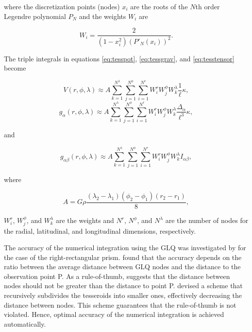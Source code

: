 \documentclass[paper,twocolumn,twoside]{geophysics}
\begin{document}
\noindent
where the discretization points (nodes) $x_i$
are the roots of the $N$th order Legendre polynomial $P_N$
and the weights $W_i$ are \citep{Hildebrand1987}

\begin{equation}
    W_i = \frac{2}{(1 - x_i^2)(P'_N(x_i))^2}.
\end{equation}

The triple integrals in equations
\ref{eq:tesspot},
\ref{eq:tessgrav},
and
\ref{eq:tesstensor}
become

\begin{equation}
    V(r,\phi,\lambda) \approx
        A
        \sum\limits_{k=1}^{N^{\lambda}}
        \sum\limits_{j=1}^{N^{\phi}}
        \sum\limits_{i=1}^{N^r}
        W^r_i W^{\phi}_j W^{\lambda}_k
        \frac{1}{\ell} \kappa,
\end{equation}
\begin{equation}
    g_{\alpha}(r,\phi,\lambda) \approx
        A
        \sum\limits_{k=1}^{N^{\lambda}}
        \sum\limits_{j=1}^{N^{\phi}}
        \sum\limits_{i=1}^{N^r}
        W^r_i W^{\phi}_j W^{\lambda}_k
        \frac{\Delta_{\alpha}}{\ell^3} \kappa,
\end{equation}

\noindent
and

\begin{equation}
    g_{\alpha\beta}(r,\phi,\lambda) \approx
        A
        \sum\limits_{k=1}^{N^{\lambda}}
        \sum\limits_{j=1}^{N^{\phi}}
        \sum\limits_{i=1}^{N^r}
        W^r_i W^{\phi}_j W^{\lambda}_k
        I_{\alpha\beta},
\end{equation}

\noindent
where

\begin{equation}
    A = G \rho
    \frac{(\lambda_2 - \lambda_1)(\phi_2 - \phi_1)(r_2 - r_1)}{8},
\end{equation}

\noindent
$W_i^r$, $W_j^{\phi}$, and $W_k^{\lambda}$
are the weights
and $N^r$, $N^{\phi}$, and $N^{\lambda}$
are the number of nodes
for the radial, latitudinal, and longitudinal dimensions, respectively.

The accuracy of the numerical integration
using the GLQ
was investigated by \citet{Ku1977}
for the case of the right-rectangular prism.
\citet{Ku1977} found that the accuracy
depends on the ratio between
the average distance between GLQ nodes
and the distance to the observation point P.
As a rule-of-thumb,
\citet{Ku1977} suggests that
the distance between nodes
should not be greater than
the distance to point P.
\citet{Li2011} devised a scheme that
recursively subdivides the tesseroids
into smaller ones,
effectively decreasing the distance between nodes.
This scheme guarantees that
the rule-of-thumb is not violated.
Hence,
optimal accuracy of the numerical integration
is achieved automatically.
\end{document}
